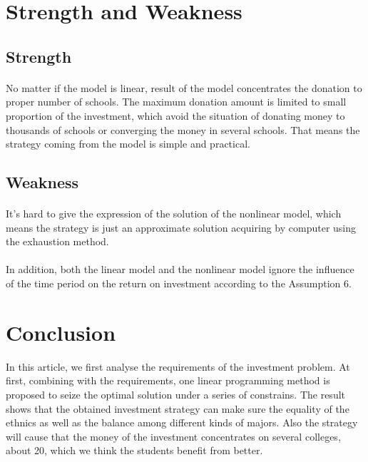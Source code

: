 \documentclass{mcmthesis}
\begin{document}
\section{Strength and Weakness}

\subsection{Strength}
\paragraph{} No matter if the model is linear, result of the model concentrates the donation to proper number of schools. The maximum donation amount is limited to small proportion of the investment, which avoid the situation of donating money to thousands of schools or converging the money in several schools. That means the strategy coming from the model is simple and practical.


\subsection{Weakness}
\paragraph{} It's hard to give the expression of the solution of the nonlinear model, which means the strategy is just an approximate solution acquiring by computer using the exhaustion method.
\paragraph{} In addition, both the linear model and the nonlinear model ignore the influence of the time period on the return on investment according to the Assumption 6.

\section{Conclusion}
In this article, we first analyse the requirements of the investment problem. At first, combining with the requirements, one linear programming method is proposed to seize the optimal solution under a series of constrains. The result shows that the obtained investment strategy can make sure the equality of the ethnics as well as the balance among different kinds of majors. Also the strategy will cause that the money of the investment concentrates on several colleges, about 20, which we think the students benefit from better.
\end{document}
